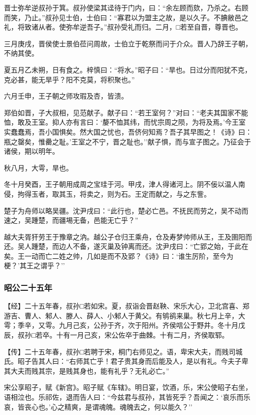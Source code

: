 \documentclass[]{article}
\begin{document}
晋士弥牟逆叔孙于箕。叔孙使梁其迳待于门内，曰：``余左顾而欬，乃杀之。右顾而笑，乃止。''叔孙见士伯，士伯曰：``寡君以为盟主之故，是以久子。不腆敝邑之礼，将致诸从者。使弥牟逆吾子。''叔孙受礼而归。二月，□若至自晋，尊晋也。

三月庚戌，晋侯使士景伯莅问周故，士伯立于乾祭而问于介众。晋人乃辞王子朝，不纳其使。

夏五月乙未朔，日有食之。梓慎曰：``将水。''昭子曰：``旱也。日过分而阳犹不克，克必甚，能无旱乎？阳不克莫，将积聚也。''

六月壬申，王子朝之师攻瑕及杏，皆溃。

郑伯如晋，子大叔相，见范献子。献子曰：``若王室何？''对曰：``老夫其国家不能恤，敢及王室。抑人亦有言曰：`嫠不恤其纬，而忧宗周之陨，为将及焉。'今王室实蠢蠢焉，吾小国惧矣。然大国之忧也，吾侪何知焉？吾子其早图之！《诗》曰：瓶之罄矣，惟罍之耻。'王室之不宁，晋之耻也。''献子惧，而与宣子图之。乃征会于诸侯，期以明年。

秋八月，大雩，旱也。

冬十月癸酉，王子朝用成周之宝珪于河。甲戌，津人得诸河上。阴不佞以温人南侵，拘得玉者，取其玉，将卖之，则为石。王定而献之，与之东訾。

楚子为舟师以略吴疆。沈尹戌曰：``此行也，楚必亡邑。不抚民而劳之，吴不动而速之，吴踵楚，而疆埸无备，邑能无亡乎？''

越大夫胥犴劳王于豫章之汭。越公子仓归王乘舟，仓及寿梦帅师从王，王及圉阳而还。吴人踵楚，而边人不备，遂灭巢及钟离而还。沈尹戌曰：``亡郢之始，于此在矣。王一动而亡二姓之帅，几如是而不及郢？《诗》曰：`谁生厉阶，至今为梗？'其王之谓乎？''

\hypertarget{header-n2767}{%
\subsubsection{昭公二十五年}\label{header-n2767}}

【经】二十五年春，叔孙□若如宋。夏，叔诣会晋赵鞅、宋乐大心，卫北宫喜、郑游吉、曹人、邾人、滕人、薛人、小邾人于黄父。有鸲鹆来巢。秋七月上辛，大雩；季辛，又雩。九月己亥，公孙于齐，次于阳州。齐侯唁公于野井。冬十月戊辰，叔孙□若卒。十有一月己亥，宋公佐卒于曲棘。十有二月，齐侯取郓。

【传】二十五年春，叔孙□若聘于宋，桐门右师见之。语，卑宋大夫，而贱司城氏。昭子告其人曰：``右师其亡乎！君子贵其身而后能及人，是以有礼。今夫子卑其大夫而贱其宗，是贱其身也，能有礼乎？无礼必亡。''

宋公享昭子，赋《新宫》。昭子赋《车辖》。明日宴，饮酒，乐，宋公使昭子右坐，语相泣也。乐祁佐，退而告人曰：``今兹君与叔孙，其皆死乎？吾闻之：`哀乐而乐哀，皆丧心也。'心之精爽，是谓魂魄。魂魄去之，何以能久？''
\end{document}
